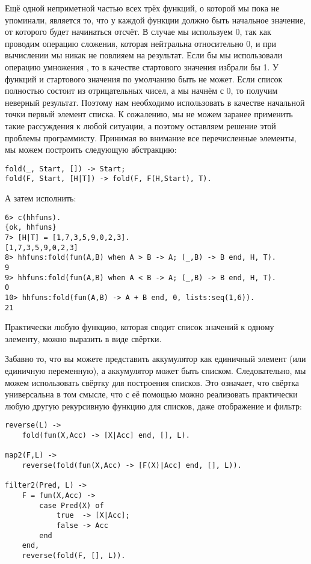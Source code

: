 Ещё одной неприметной частью всех трёх функций, о которой мы пока не упоминали, является то, что у каждой функции должно быть начальное значение, от которого будет начинаться отсчёт. В случае  мы используем 0, так как проводим операцию сложения, которая нейтральна относительно 0, и при вычислении  мы никак не повлияем на результат. Если бы мы использовали операцию умножения , то в качестве стартового значения избрали бы 1. У функций  и  стартового значения по умолчанию быть не может. Если список полностью состоит из отрицательных чисел, а мы начнём с 0, то получим неверный результат. Поэтому нам необходимо использовать в качестве начальной точки первый элемент списка. К сожалению, мы не можем заранее применить такие рассуждения к любой ситуации, а поэтому оставляем решение этой проблемы программисту. Принимая во внимание все перечисленные элементы, мы можем построить следующую абстракцию:
\begin{lstlisting}[style=erlang]
fold(_, Start, []) -> Start;
fold(F, Start, [H|T]) -> fold(F, F(H,Start), T).
\end{lstlisting}
А затем исполнить:
\begin{lstlisting}[style=erlang]
6> c(hhfuns).
{ok, hhfuns}
7> [H|T] = [1,7,3,5,9,0,2,3].   
[1,7,3,5,9,0,2,3]
8> hhfuns:fold(fun(A,B) when A > B -> A; (_,B) -> B end, H, T).
9
9> hhfuns:fold(fun(A,B) when A < B -> A; (_,B) -> B end, H, T).
0
10> hhfuns:fold(fun(A,B) -> A + B end, 0, lists:seq(1,6)).
21
\end{lstlisting}

Практически любую функцию, которая сводит список значений к одному элементу, можно выразить в виде свёртки.

Забавно то, что вы можете представить аккумулятор как единичный элемент (или единичную переменную), а аккумулятор может быть списком. Следовательно, мы можем использовать свёртку для построения списков. Это означает, что свёртка универсальна в том смысле, что с её помощью можно реализовать практически любую другую рекурсивную функцию для списков, даже отображение и фильтр:
\begin{lstlisting}[style=erlang]
reverse(L) ->
    fold(fun(X,Acc) -> [X|Acc] end, [], L).
 
map2(F,L) ->
    reverse(fold(fun(X,Acc) -> [F(X)|Acc] end, [], L)).
 
filter2(Pred, L) ->
    F = fun(X,Acc) ->
        case Pred(X) of
            true  -> [X|Acc];
            false -> Acc
        end
    end,
    reverse(fold(F, [], L)).
\end{lstlisting}

